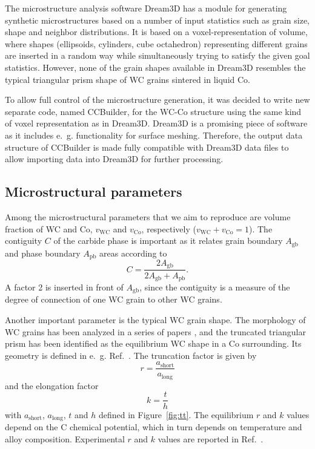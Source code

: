 \documentclass[10pt,a4paper]{article}
\begin{document}
The microstructure analysis software Dream3D \cite{GrJa14,Dream3D} has a module for generating synthetic microstructures based on a number of input statistics such as grain size, shape and neighbor distributions. It is based on a voxel-representation of volume, where shapes (ellipsoids, cylinders, cube octahedron) representing different grains are inserted in a random way while simultaneously trying to satisfy the given goal statistics. However, none of the grain shapes available in Dream3D resembles the typical triangular prism shape of WC grains sintered in liquid Co.

To allow full control of the microstructure generation, it was decided to write new separate code, named CCBuilder, for the WC-Co structure using the same kind of voxel representation as in Dream3D. Dream3D is a promising piece of software as it includes e.~g. functionality for surface meshing. Therefore, the output data structure of CCBuilder is made fully compatible with Dream3D data files to allow importing data into Dream3D for further processing.

\subsection{Microstructural parameters}
\label{subsec:microstructural_param}
Among the microstructural parameters that we aim to reproduce are volume fraction of WC and Co, $v_\text{WC}$ and $v_\text{Co}$, respectively ($v_\text{WC}+v_\text{Co}=1$). The contiguity $C$ of the carbide phase is important as it relates grain boundary $A_\text{gb}$ and phase boundary $A_\text{pb}$ areas according to \cite{Ex79,LaMi14}
\begin{equation}
	C = \frac{2 A_\text{gb}}{2 A_\text{gb} + A_\text{pb}}.
\end{equation}
A factor 2 is inserted in front of $A_\text{gb}$, since the contiguity is a measure of the degree of connection of one WC grain to other WC grains.

Another important parameter is the typical WC grain shape. The morphology of WC grains has been analyzed in a series of papers \cite{ChWaAlLa05,ChWaLaAl07,LaAlChWa08}, and the truncated triangular prism has been identified as the equilibrium WC shape in a Co surrounding. Its geometry is defined in e.~g. Ref.~\cite{ChWaLaAl07}. The truncation factor is given by
\begin{equation}
	r = \frac{a_\text{short}}{a_\text{long}}
\end{equation}
and the elongation factor
\begin{equation}
	k = \frac{t}{h}
\end{equation}
with $a_\text{short}$, $a_\text{long}$, $t$ and $h$ defined in Figure~\ref{fig:tt}. The equilibrium $r$ and $k$ values depend on the C chemical potential, which in turn depends on temperature and alloy composition. Experimental $r$ and $k$ values are reported in Ref.~\cite{LaAlChWa08}.
\end{document}
